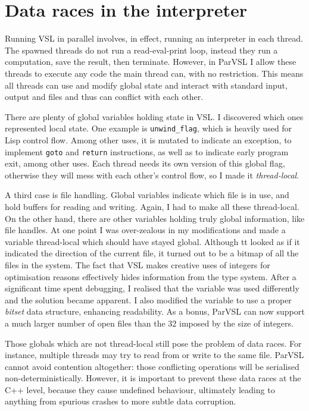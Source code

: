 \section{Data races in the interpreter}
\label{sec:datarace}

Running VSL in parallel involves, in effect, running an interpreter in each thread. The spawned threads do not
run a read-eval-print loop, instead they run a computation, save the result, then terminate. However,
in ParVSL I allow these threads to execute any code the main thread can, with no restriction. This means
all threads can use and modify global state and interact with standard input, output and files and
thus can conflict with each other.

There are plenty of global variables holding state in VSL. I discovered which ones represented local
state.
One example is \verb|unwind_flag|, which is heavily used for Lisp control flow. Among other uses, it is
mutated to indicate an exception, to implement \verb|goto| and \verb|return| instructions,
as well as to indicate early program exit,
among other uses. Each thread needs its own version of this global flag, otherwise they will mess with each
other's control flow, so I made it \emph{thread-local}.

A third case is file handling. Global variables indicate which file is in use, and hold buffers for reading
and writing. Again, I had to make all these thread-local. On the other hand, there are other variables holding
truly global information, like file handles. At one point I was over-zealous in
my modifications and made a variable thread-local which should have stayed global. Although tt looked as if it indicated
the direction of the current file, it turned out to be a bitmap of all the files in the system. The fact
that VSL makes creative uses of integers for optimisation reasons effectively hides information from the type system.
After a significant time spent debugging, I realised that the variable was used differently and the solution became apparent.
I also modified the variable to use a proper \emph{bitset} data structure, enhancing readability.
As a bonus, ParVSL can now support a much larger number of open files than the 32 imposed by the size of integers.

Those globals which are not thread-local still pose the problem of data races. For instance, multiple threads
may try to read from or write to the same file. ParVSL cannot avoid contention altogether: those conflicting
operations will be serialised non-deterministically. However, it is important to prevent these data races at
the C++ level, because they cause undefined behaviour, ultimately leading to anything from spurious crashes
to more subtle data corruption.

